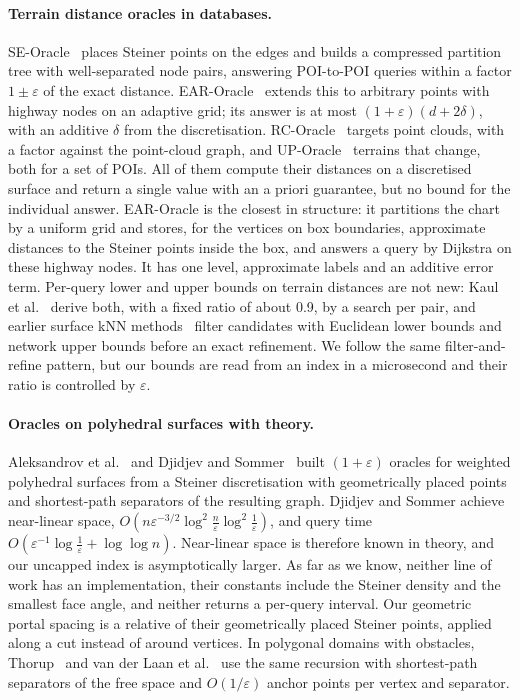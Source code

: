 \documentclass[sigconf,nonacm,screen]{acmart}
\newcommand{\eps}{\varepsilon}
\begin{document}
\paragraph{Terrain distance oracles in databases.}
SE-Oracle~\cite{wei2017distance} places Steiner points on the edges and builds a compressed partition tree
with well-separated node pairs, answering POI-to-POI queries within a factor $1\pm\eps$ of the exact distance.
EAR-Oracle~\cite{huang2023ear} extends this to arbitrary points with highway nodes on an adaptive grid; its
answer is at most $(1+\eps)(d+2\delta)$, with an additive $\delta$ from the discretisation. RC-Oracle~\cite{yan2024rc}
targets point clouds, with a factor against the point-cloud graph, and UP-Oracle~\cite{yan2025up} terrains that
change, both for a set of POIs. All of them compute their distances on a discretised surface and return a single
value with an a priori guarantee, but no bound for the individual answer.
EAR-Oracle is the closest in structure: it partitions the chart by a uniform grid and stores, for the vertices
on box boundaries, approximate distances to the Steiner points inside the box, and answers a query by Dijkstra
on these highway nodes. It has one level, approximate labels and an additive error term. Per-query lower and
upper bounds on terrain distances are not new: Kaul et al.~\cite{kaul2013finding,kaul2015new} derive both,
with a fixed ratio of about 0.9, by a search per pair, and earlier surface kNN
methods~\cite{deng2006surface,shahabi2008indexing} filter candidates with Euclidean lower bounds and network
upper bounds before an exact refinement. We follow the same filter-and-refine pattern, but our bounds are read
from an index in a microsecond and their ratio is controlled by $\eps$.

\paragraph{Oracles on polyhedral surfaces with theory.}
Aleksandrov et al.~\cite{aleksandrov2005determining,aleksandrov2010algorithms} and Djidjev and
Sommer~\cite{djidjev2011approximate} built $(1+\eps)$ oracles for weighted polyhedral surfaces from a
Steiner discretisation with geometrically placed points and shortest-path separators of the resulting graph.
Djidjev and Sommer achieve near-linear space,
$O(n\eps^{-3/2}\log^2\frac{n}{\eps}\log^2\frac{1}{\eps})$, and query time
$O(\eps^{-1}\log\frac1\eps + \log\log n)$. Near-linear space is therefore known in theory, and our
uncapped index is asymptotically larger. As far as we know, neither line of work has an implementation,
their constants include the Steiner density and the smallest face angle, and neither returns a per-query
interval. Our geometric portal spacing is a relative of their geometrically placed Steiner points, applied
along a cut instead of around vertices. In polygonal domains with obstacles, Thorup~\cite{thorup2007compact}
and van der Laan et al.~\cite{vanderlaan2026approximate} use the same recursion with shortest-path separators
of the free space and $O(1/\eps)$ anchor points per vertex and separator.
\end{document}
